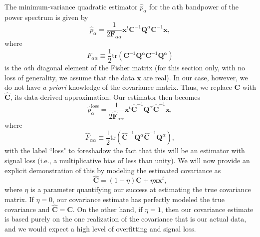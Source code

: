 \documentclass[preprint2,numberedappendix,tighten]{aastex6}  %
\newcommand{\x}{\mathbf{x}}
\newcommand{\C}{\mathbf{C}}
\newcommand{\Chat}{\mathbf{\widehat{C}}}
\newcommand{\F}{\mathbf{F}}
\newcommand{\Q}{\mathbf{Q}}
\begin{document}
The minimum-variance quadratic estimator $\widehat{p}_\alpha$ for the $\alpha$th bandpower of the power spectrum is given by 
\begin{equation}
\widehat{p}_\alpha = \frac{1} {2 \F_{\alpha \alpha} }\x^t \C^{-1} \Q^{\alpha} \C^{-1} \x,
\end{equation}
where
\begin{equation}
F_{\alpha \alpha} \equiv \frac{1}{2} \textrm{tr} \left( \C^{-1} \Q^\alpha \C^{-1} \Q^\alpha \right)
\end{equation}
is the $\alpha$th diagonal element of the Fisher matrix (for this section only, with no loss of generality, we assume that the data $\textbf{x}$ are real). In our case, however, we do not have \emph{a priori} knowledge of the covariance matrix. Thus, we replace $\C$ with $\Chat$, its data-derived approximation. Our estimator then becomes
\begin{equation}
\label{eq:phatloss}
\widehat{p}_\alpha^\textrm{loss} = \frac{1} {2 \widehat{\F}_{\alpha \alpha} }\x^t \Chat^{-1} \Q^{\alpha} \Chat^{-1} \x,
\end{equation}
where
\begin{equation}
\widehat{F}_{\alpha \alpha} \equiv \frac{1}{2} \textrm{tr} \left( \Chat^{-1} \Q^\alpha \Chat^{-1} \Q^\alpha \right),
\end{equation}
with the label ``loss" to foreshadow the fact that this will be an estimator with signal loss (i.e., a multiplicative bias of less than unity). We will now provide an explicit demonstration of this by modeling the estimated covariance as
\begin{equation}
\label{eq:ChatDef}
\Chat = (1-\eta) \C + \eta \x \x^t,
\end{equation}
where $\eta$ is a parameter quantifying our success at estimating the true covariance matrix. If $\eta = 0$, our covariance estimate has perfectly modeled the true covariance and $\Chat = \C$. On the other hand, if $\eta =1$, then our covariance estimate is based purely on the one realization of the covariance that is our actual data, and we would expect a high level of overfitting and signal loss.
\end{document}
